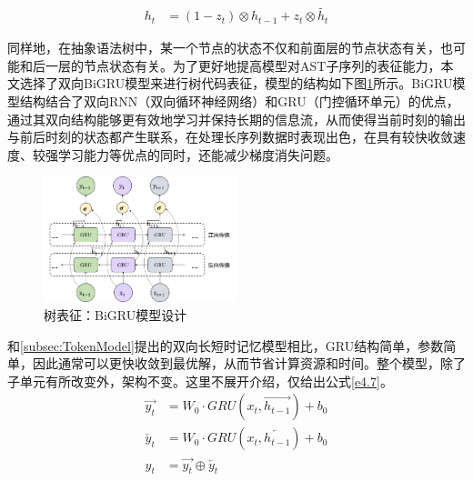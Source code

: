 \begin{equation}\label{e4.6}
  \begin{split}
   h_t &= \left(1- z_t\right) \otimes h_{t-1} +  z_t \otimes \widetilde{h_t}
  \end{split}
\end{equation}

同样地，在抽象语法树中，某一个节点的状态不仅和前面层的节点状态有关，也可能和后一层的节点状态有关。为了更好地提高模型对AST子序列的表征能力，本文选择了双向BiGRU模型来进行树代码表征，模型的结构如下图\ref{fig:BiGRU}所示。BiGRU模型结构结合了双向RNN（双向循环神经网络）和GRU（门控循环单元）的优点，通过其双向结构能够更有效地学习并保持长期的信息流，从而使得当前时刻的输出与前后时刻的状态都产生联系，在处理长序列数据时表现出色，在具有较快收敛速度、较强学习能力等优点的同时，还能减少梯度消失问题。

\begin{figure}[H]
  \centering
  \includegraphics[width=0.5\textwidth]{figures/BiGRU.png}
  \caption{树表征：BiGRU模型设计}\label{fig:BiGRU}
\end{figure}

和\ref{subsec:TokenModel}提出的双向长短时记忆模型相比，GRU结构简单，参数简单，因此通常可以更快收敛到最优解，从而节省计算资源和时间。整个模型，除了子单元有所改变外，架构不变。这里不展开介绍，仅给出公式\ref{e4.7}。
\begin{equation}\label{e4.7}
  \begin{split}
    \overrightarrow{y_t} &= W_0 \cdot GRU\left(x_{t},\overrightarrow{h_{t-1}}\right) + b_0
    \\
    \overleftarrow{y_t} &= W_0 \cdot GRU\left(x_{t},\overleftarrow{h_{t-1}}\right) + b_0
    \\
    y_t &= \overrightarrow{y_t} \oplus\overleftarrow{y_t}
  \end{split}
\end{equation}


